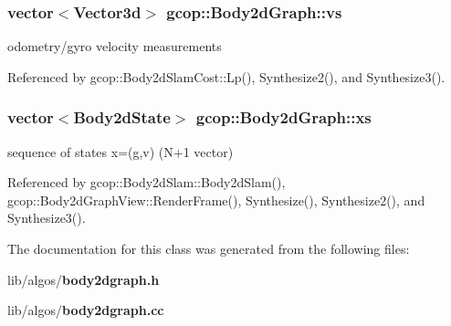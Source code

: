 \subsubsection[{vs}]{\setlength{\rightskip}{0pt plus 5cm}vector$<$\-Vector3d$>$ {\bf gcop\-::\-Body2d\-Graph\-::vs}}\label{classgcop_1_1Body2dGraph_ae0721884fc06c747df88dc74919b9551}


odometry/gyro velocity measurements 



\-Referenced by gcop\-::\-Body2d\-Slam\-Cost\-::\-Lp(), \-Synthesize2(), and \-Synthesize3().

\subsubsection[{xs}]{\setlength{\rightskip}{0pt plus 5cm}vector$<${\bf \-Body2d\-State}$>$ {\bf gcop\-::\-Body2d\-Graph\-::xs}}\label{classgcop_1_1Body2dGraph_a6a54b350d5d56e6a6cf0ea7331785f1c}


sequence of states x=(g,v) (\-N+1 vector) 



\-Referenced by gcop\-::\-Body2d\-Slam\-::\-Body2d\-Slam(), gcop\-::\-Body2d\-Graph\-View\-::\-Render\-Frame(), \-Synthesize(), \-Synthesize2(), and \-Synthesize3().



\-The documentation for this class was generated from the following files\-:\begin{DoxyCompactItemize}
\item 
lib/algos/{\bf body2dgraph.\-h}\item 
lib/algos/{\bf body2dgraph.\-cc}\end{DoxyCompactItemize}
